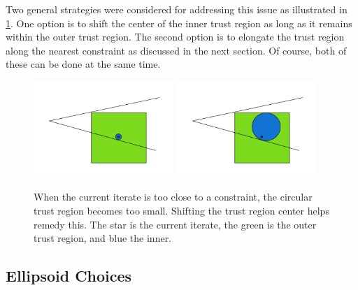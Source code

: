 Two general strategies were considered for addressing this issue as illustrated in \cref{options_basis}.
One option is to shift the center of the inner trust region as long as it remains within the outer trust region.
The second option is to elongate the trust region along the nearest constraint as discussed in the next section.
Of course, both of these can be done at the same time.


\begin{figure}[ht]
    \centering
    \includegraphics[width=200px]{images/small_circle.png}
    \includegraphics[width=200px]{images/shifted_center.png}
    \caption{When the current iterate is too close to a constraint, the circular trust region becomes too small. Shifting the trust region center helps remedy this. The star is the current iterate, the green is the outer trust region, and blue the inner.}
    \label{options_basis}
\end{figure}

\subsection{Ellipsoid Choices}

